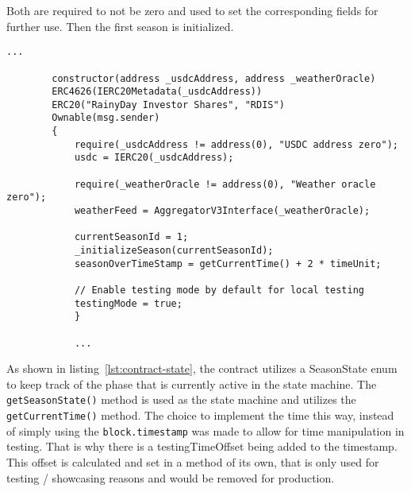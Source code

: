 \documentclass[11pt,a4paper]{article}
\begin{document}
		Both are required to not be zero and used to set the corresponding fields for further use.
		Then the first season is initialized.

		\begin{lstlisting}[style=soliditystyle, caption={RainyDayFund.sol - Main Insurance Contract},label={lst:contract-ctor}]
		...

		constructor(address _usdcAddress, address _weatherOracle)
		ERC4626(IERC20Metadata(_usdcAddress))
		ERC20("RainyDay Investor Shares", "RDIS")
		Ownable(msg.sender)
		{
			require(_usdcAddress != address(0), "USDC address zero");
			usdc = IERC20(_usdcAddress);

			require(_weatherOracle != address(0), "Weather oracle zero");
			weatherFeed = AggregatorV3Interface(_weatherOracle);

			currentSeasonId = 1;
			_initializeSeason(currentSeasonId);
			seasonOverTimeStamp = getCurrentTime() + 2 * timeUnit;

			// Enable testing mode by default for local testing
			testingMode = true;
			}

			...
		\end{lstlisting}

		As shown in listing~\ref{lst:contract-state}, the contract utilizes a SeasonState enum to keep track of the phase that is currently active in the state machine.
		The \texttt{getSeasonState()} method is used as the state machine and utilizes the \texttt{getCurrentTime()} method.
		The choice to implement the time this way, instead of simply using the \texttt{block.timestamp} was made to allow for time manipulation in testing.
		That is why there is a testingTimeOffset being added to the timestamp.
		This offset is calculated and set in a method of its own, that is only used for testing / showcasing reasons and would be removed for production.
\end{document}
